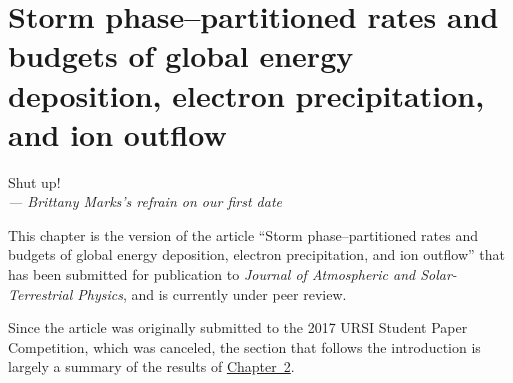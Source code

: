 
\chapter{Storm phase--partitioned rates and budgets of global \Alfic
  energy deposition, electron precipitation, and ion outflow}
\label{chp:3}

\begin{flushright}
  \begin{minipage}[]{0.5\linewidth}
    \begin{flushright}
      Shut up!  \\{\small \emph{--- Brittany Marks's refrain on our first date } }
    \end{flushright}
  \end{minipage}
\end{flushright}
\vspace{\baselineskip}

This chapter is the version of the article ``Storm phase--partitioned rates and
budgets of global \Alfic energy deposition, electron precipitation, and ion
outflow'' that has been submitted for publication to \emph{Journal of
  Atmospheric and Solar-Terrestrial Physics}, and is currently under peer review.

Since the article was originally submitted to the 2017 URSI Student Paper
Competition, which was canceled, the section that follows the introduction is
largely a summary of the results of \hyperref[chp:2]{Chapter~2}.

